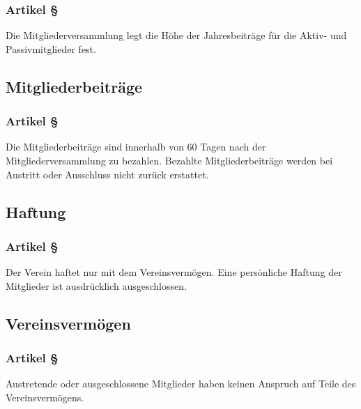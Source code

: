 \subsubsection*{Artikel §\articlenumber}
Die Mitgliederversammlung legt die Höhe der Jahresbeiträge 
für die Aktiv- und Passivmitglieder fest.

\subsection{Mitgliederbeiträge}

\subsubsection*{Artikel §\articlenumber}
Die Mitgliederbeiträge sind innerhalb von 60 Tagen nach der 
Mitgliederversammlung zu bezahlen.
Bezahlte Mitgliederbeiträge werden bei Austritt oder 
Ausschluss nicht zurück erstattet.

\subsection{Haftung}

\subsubsection*{Artikel §\articlenumber}
Der Verein haftet nur mit dem Vereinsvermögen. Eine
persönliche Haftung der Mitglieder ist ausdrücklich
ausgeschlossen.

\subsection{Vereinsvermögen}

\subsubsection*{Artikel §\articlenumber}
Austretende oder ausgeschlossene Mitglieder haben keinen 
Anspruch auf Teile des Vereinsvermögens.
